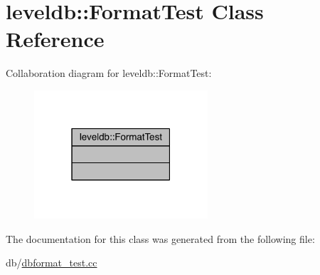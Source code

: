 \hypertarget{classleveldb_1_1_format_test}{}\section{leveldb\+:\+:Format\+Test Class Reference}
\label{classleveldb_1_1_format_test}


Collaboration diagram for leveldb\+:\+:Format\+Test\+:\nopagebreak
\begin{figure}[H]
\begin{center}
\leavevmode
\includegraphics[width=183pt]{classleveldb_1_1_format_test__coll__graph}
\end{center}
\end{figure}


The documentation for this class was generated from the following file\+:\begin{DoxyCompactItemize}
\item 
db/\hyperlink{dbformat__test_8cc}{dbformat\+\_\+test.\+cc}\end{DoxyCompactItemize}
